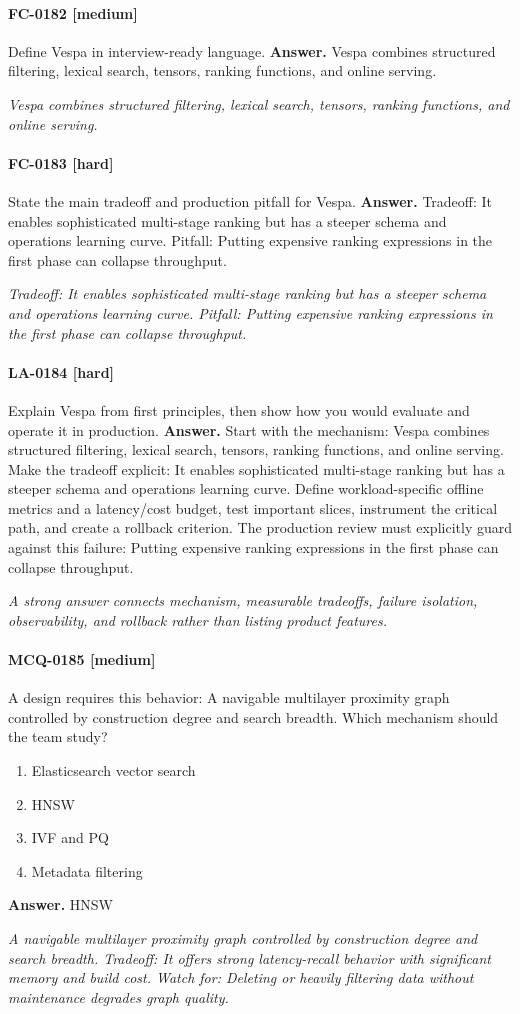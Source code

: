 \paragraph{FC-0182 [medium]} Define Vespa in interview-ready language.
\noindent\textbf{Answer.} Vespa combines structured filtering, lexical search, tensors, ranking functions, and online serving.
\par\textit{Vespa combines structured filtering, lexical search, tensors, ranking functions, and online serving.}
\paragraph{FC-0183 [hard]} State the main tradeoff and production pitfall for Vespa.
\noindent\textbf{Answer.} Tradeoff: It enables sophisticated multi-stage ranking but has a steeper schema and operations learning curve. Pitfall: Putting expensive ranking expressions in the first phase can collapse throughput.
\par\textit{Tradeoff: It enables sophisticated multi-stage ranking but has a steeper schema and operations learning curve. Pitfall: Putting expensive ranking expressions in the first phase can collapse throughput.}
\paragraph{LA-0184 [hard]} Explain Vespa from first principles, then show how you would evaluate and operate it in production.
\noindent\textbf{Answer.} Start with the mechanism: Vespa combines structured filtering, lexical search, tensors, ranking functions, and online serving. Make the tradeoff explicit: It enables sophisticated multi-stage ranking but has a steeper schema and operations learning curve. Define workload-specific offline metrics and a latency/cost budget, test important slices, instrument the critical path, and create a rollback criterion. The production review must explicitly guard against this failure: Putting expensive ranking expressions in the first phase can collapse throughput.
\par\textit{A strong answer connects mechanism, measurable tradeoffs, failure isolation, observability, and rollback rather than listing product features.}
\paragraph{MCQ-0185 [medium]} A design requires this behavior: A navigable multilayer proximity graph controlled by construction degree and search breadth. Which mechanism should the team study?
\begin{enumerate}[label=\Alph*.]
\item Elasticsearch vector search
\item HNSW
\item IVF and PQ
\item Metadata filtering
\end{enumerate}
\noindent\textbf{Answer.} HNSW
\par\textit{A navigable multilayer proximity graph controlled by construction degree and search breadth. Tradeoff: It offers strong latency-recall behavior with significant memory and build cost. Watch for: Deleting or heavily filtering data without maintenance degrades graph quality.}
